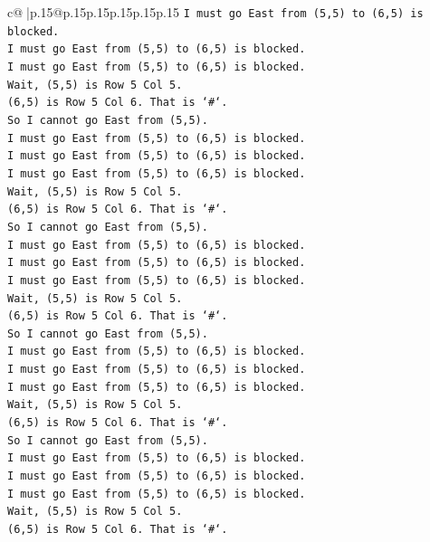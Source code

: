 \documentclass{article}
\begin{document}
{\begin{supertabular}{c@{$\;$}|p{.15\linewidth}@{}p{.15\linewidth}p{.15\linewidth}p{.15\linewidth}p{.15\linewidth}p{.15\linewidth}}
{{{\texttt{I must go East from (5,5) to (6,5) is blocked.} \\
\texttt{I must go East from (5,5) to (6,5) is blocked.} \\
\texttt{I must go East from (5,5) to (6,5) is blocked.} \\
\texttt{Wait, (5,5) is Row 5 Col 5.} \\
\texttt{(6,5) is Row 5 Col 6. That is `\#`.} \\
\texttt{So I cannot go East from (5,5).} \\
\texttt{I must go East from (5,5) to (6,5) is blocked.} \\
\texttt{I must go East from (5,5) to (6,5) is blocked.} \\
\texttt{I must go East from (5,5) to (6,5) is blocked.} \\
\texttt{Wait, (5,5) is Row 5 Col 5.} \\
\texttt{(6,5) is Row 5 Col 6. That is `\#`.} \\
\texttt{So I cannot go East from (5,5).} \\
\texttt{I must go East from (5,5) to (6,5) is blocked.} \\
\texttt{I must go East from (5,5) to (6,5) is blocked.} \\
\texttt{I must go East from (5,5) to (6,5) is blocked.} \\
\texttt{Wait, (5,5) is Row 5 Col 5.} \\
\texttt{(6,5) is Row 5 Col 6. That is `\#`.} \\
\texttt{So I cannot go East from (5,5).} \\
\texttt{I must go East from (5,5) to (6,5) is blocked.} \\
\texttt{I must go East from (5,5) to (6,5) is blocked.} \\
\texttt{I must go East from (5,5) to (6,5) is blocked.} \\
\texttt{Wait, (5,5) is Row 5 Col 5.} \\
\texttt{(6,5) is Row 5 Col 6. That is `\#`.} \\
\texttt{So I cannot go East from (5,5).} \\
\texttt{I must go East from (5,5) to (6,5) is blocked.} \\
\texttt{I must go East from (5,5) to (6,5) is blocked.} \\
\texttt{I must go East from (5,5) to (6,5) is blocked.} \\
\texttt{Wait, (5,5) is Row 5 Col 5.} \\
\texttt{(6,5) is Row 5 Col 6. That is `\#`.} \\
}}}
\end{supertabular}}
\end{document}
